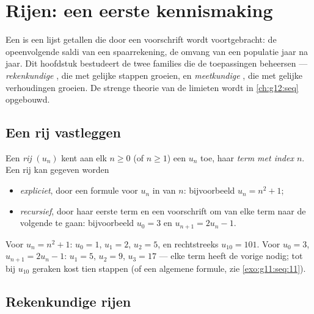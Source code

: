 \chapter{Rijen: een eerste kennismaking}\label{ch:g11:seq}

Een  is een lijst getallen die door een voorschrift wordt voortgebracht: de
opeenvolgende saldi van een spaarrekening, de omvang van een populatie jaar na
jaar. Dit hoofdstuk bestudeert de twee families die de toepassingen
beheersen --- \emph{rekenkundige} , die met gelijke stappen groeien, en
\emph{meetkundige} , die met gelijke verhoudingen groeien. De strenge
theorie van de limieten wordt in \cref{ch:g12:seq} opgebouwd.

\section{Een rij vastleggen}

\begin{definition}[Rij]\label{def:g11:seq:sequence}
Een \emph{rij} $(u_n)$ kent aan elk  $n \geq 0$ (of
$n \geq 1$) een  $u_n$ toe, haar \emph{term met index $n$}. Een
rij kan gegeven worden
\begin{itemize}
  \item \emph{expliciet}, door een formule voor $u_n$ in  van $n$:
        bijvoorbeeld $u_n = n^2 + 1$;
  \item \emph{recursief}, door haar eerste term en een voorschrift om van
        elke term naar de volgende te gaan: bijvoorbeeld $u_0 = 3$ en
        $u_{n+1} = 2u_n - 1$.
\end{itemize}
\end{definition}

\begin{example}
Voor $u_n = n^2 + 1$: $u_0 = 1$, $u_1 = 2$, $u_2 = 5$, en rechtstreeks
$u_{10} = 101$. Voor $u_0 = 3$, $u_{n+1} = 2u_n - 1$: $u_1 = 5$, $u_2 = 9$,
$u_3 = 17$ --- elke term heeft de vorige nodig; tot bij $u_{10}$ geraken
kost tien stappen (of een algemene formule, zie \cref{exo:g11:seq:11}).
\end{example}

\section{Rekenkundige rijen}

